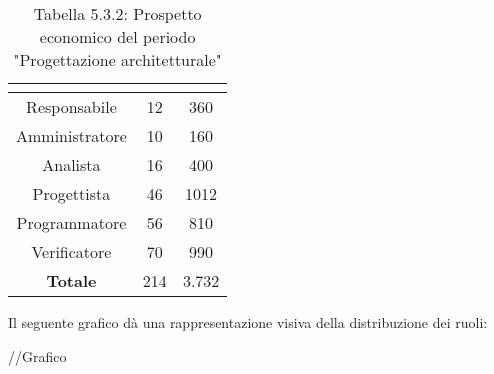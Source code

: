 \renewcommand{\arraystretch}{1.5}
\begin{table}[H]
\begin{center}
\begin{tabular}{|c|c|c|}
\hline
\rowcolor{title_row}
\textbf{\color{title_text}{Ruolo}}  & \textbf{\color{title_text}{Ore}} & \textbf{\color{title_text}{Costo in \euro}} \\ \hline
Responsabile    & 12              & 360                     \\ \hline
Amministratore  & 10              & 160                    \\ \hline
Analista        & 16              & 400                    \\ \hline
Progettista     & 46              & 1012                     \\ \hline
Programmatore   & 56              & 810                     \\ \hline
Verificatore    & 70              & 990                    \\ \hline
\textbf{Totale} & 214 \textbf{}    & 3.732\textbf{}           \\ \hline
\end{tabular}
\caption{Tabella 5.3.2: Prospetto economico del periodo "Progettazione architetturale"\label{}}
\end{center}
\end{table}
\renewcommand{\arraystretch}{1}

Il seguente grafico dà una rappresentazione visiva della distribuzione dei ruoli: \\
\begin{center}
//Grafico
\end{center}

\pagebreak